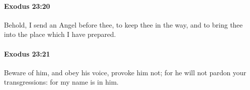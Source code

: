 		\paragraph{Exodus 23:20} %
			\label{EXODUS-23-20}

			Behold, I send an Angel before thee, to keep thee in the way, and to bring thee into the place which I have prepared.


		\paragraph{Exodus 23:21} %
			\label{EXODUS-23-21}

			Beware of him, and obey his voice, provoke him not; for he will not pardon your transgressions: for my name is in him.


